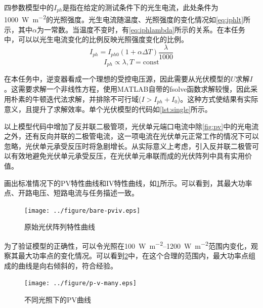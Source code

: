 \documentclass[a4paper,12pt]{article}
\begin{document}
    四参数模型中的$I_{ph}$是指在给定的测试条件下的光生电流，此处条件为\SI{1000}{\W\per\meter\squared}的光照强度。光生电流随温度、光照强度的变化情况如\cref{eq:iphlt}所示，其中$\alpha$为一常数。当温度不变时，有\cref{eq:iphlambda}所示的关系。在本任务中，可以以光生电流变化的比例反映光照强度变化的比例。
    \begin{equation}
        I_{ph}=I_{ph0}\left(1+\alpha \Delta T\right)\frac{\lambda}{1000}
        \label{eq:iphlt}
    \end{equation}
    \begin{equation}
        I_{ph} \propto \lambda, T=\text{const}
        \label{eq:iphlambda}
    \end{equation}

    在本任务中，逆变器看成一个理想的受控电压源，因此需要从光伏模型的$U$求解$I$。这需要求解一个非线性方程，使用MATLAB自带的fsolve函数求解较慢，因此采用朴素的牛顿迭代法求解，并排除不可行域($I>I_{ph}+I_0$)。这种方式使结果有实际意义，且提升了求解效率。单个光伏模型的代码如\cref{lst:single}所示。
    

    以上模型代码中增加了反并联二极管项，光伏单元端口电流中除\cref{fig:pv}中的光电流之外，还有反向并联的二极管电流，这一项电流在光伏单元正常工作的情况下可以忽略，光伏单元承受反压时将急剧增长。从实际意义上考虑，引入反并联二极管可以有效地避免光伏单元承受反压，在光伏单元串联而成的光伏阵列中具有实用价值。

    画出标准情况下的PV特性曲线和IV特性曲线，如\cref{fig:bare-pviv}所示。可以看到，其最大功率点、开路电压、短路电流与任务描述一致。
    \begin{figure}[htbp]
        \centering
        \texttt{[image: ../figure/bare-pviv.eps]}
        \caption{原始光伏阵列特性曲线}
        \label{fig:bare-pviv}
    \end{figure}

    为了验证模型的正确性，可以令光照在\SIrange{100}{1200}{\W\per\meter\squared}范围内变化，观察其最大功率点的变化情况。可以看到\cref{fig:p-v-many}中，在这个合理的范围内，最大功率点组成的曲线是向右倾斜的，符合经验。
    \begin{figure}[htbp]
        \centering
        \texttt{[image: ../figure/p-v-many.eps]}
        \caption{不同光照下的PV曲线}
        \label{fig:p-v-many}
    \end{figure}
\end{document}
